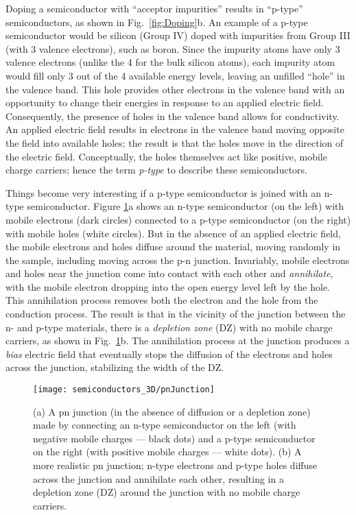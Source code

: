 Doping a semiconductor with ``acceptor impurities'' results in
``p-type'' semiconductors, as shown in Fig.~\ref{fig:Doping}b.
An example of a p-type semiconductor would be silicon (Group IV)
doped with impurities from Group III (with 3 valence electrons), such as
boron. Since the impurity atoms have only 3 valence electrons (unlike
the 4 for the bulk silicon atoms), each impurity atom would fill only
3 out of the 4 available energy levels, leaving an unfilled ``hole''
in the valence band. This hole provides other electrons in the valence 
band with an opportunity to change their energies in response to
an applied electric field. Consequently, the presence of holes in
the valence band allows for conductivity. An applied electric field
results in electrons in the valence band moving opposite the
field into available holes; the result is that the holes move
in the direction of the electric field. Conceptually, the holes themselves
act like positive, mobile charge carriers; hence the term {\it p-type}
to describe these semiconductors.

Things become very interesting if a p-type semiconductor is joined
with an n-type semiconductor. Figure \ref{fig:pnJunction}a shows
an n-type semiconductor (on the left) with mobile electrons (dark
circles) connected to a p-type semiconductor (on the right) with
mobile holes (white circles). But in the absence of an applied
electric field, the mobile electrons and holes diffuse around the 
material, moving randomly in the sample, including moving across 
the p-n junction. Invariably, mobile electrons and holes near the
junction come into contact with each other and {\it annihilate},
with the mobile electron dropping into the open energy level left
by the hole. This annihilation process removes both the electron and
the hole from the conduction process. The result is that in
the vicinity of the junction between the n- and p-type materials, there
is a {\it depletion zone} (DZ) with no mobile charge 
carriers, as shown in Fig.~\ref{fig:pnJunction}b. The annihilation process at the junction produces
a {\it bias} electric field that eventually stops the diffusion of the
electrons and holes across the junction, stabilizing the width
of the DZ.

\begin{figure}
\begin{center}
\texttt{[image: semiconductors\_3D/pnJunction]}
\end{center} 
\caption{(a) A pn junction (in the absence of diffusion or a depletion
zone) made by connecting an n-type semiconductor on the left (with
negative mobile charges --- black dots) and a p-type semiconductor 
on the right (with positive mobile charges --- white dots). 
(b) A more realistic pn junction; n-type electrons and p-type holes diffuse
across the junction and annihilate each other, resulting in a depletion
zone (DZ) around the junction with no mobile charge carriers.
} 
\label{fig:pnJunction} 
\end{figure}

